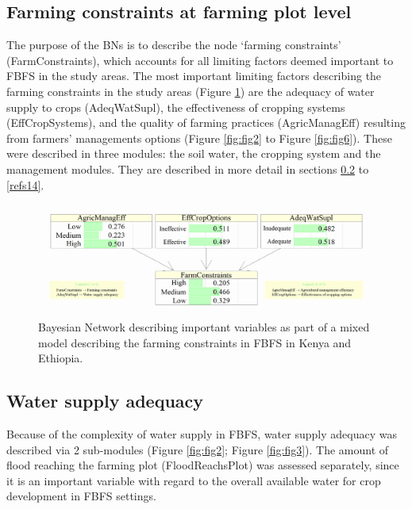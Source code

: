 \documentclass[]{elsarticle} %
\begin{document}
\hypertarget{refs11}{%
\subsection{Farming constraints at farming plot level}\label{refs11}}

The purpose of the BNs is to describe the node `farming constraints' (FarmConstraints), which accounts for all limiting factors deemed important to FBFS in the study areas. The most important limiting factors describing the farming constraints in the study areas (Figure \ref{fig:fig1}) are the adequacy of water supply to crops (AdeqWatSupl), the effectiveness of cropping systems (EffCropSystems), and the quality of farming practices (AgricManagEff) resulting from farmers' managements options (Figure \ref{fig:fig2} to Figure \ref{fig:fig6}). These were described in three modules: the soil water, the cropping system and the management modules. They are described in more detail in sections \ref{refs12} to \ref{refs14}.

\begin{figure}[!h]

{\centering \includegraphics[width=1\linewidth,]{figures/Modelling_FBFS_Suppl_Farming_Constraints_BNs_plot} 

}

\caption{Bayesian Network describing important variables as part of a mixed model describing the farming constraints in FBFS in Kenya and Ethiopia.}\label{fig:fig1}
\end{figure}

\hypertarget{refs12}{%
\subsection{Water supply adequacy}\label{refs12}}

Because of the complexity of water supply in FBFS, water supply adequacy was described via 2 sub-modules (Figure \ref{fig:fig2}; Figure \ref{fig:fig3}). The amount of flood reaching the farming plot (FloodReachsPlot) was assessed separately, since it is an important variable with regard to the overall available water for crop development in FBFS settings.
\end{document}
